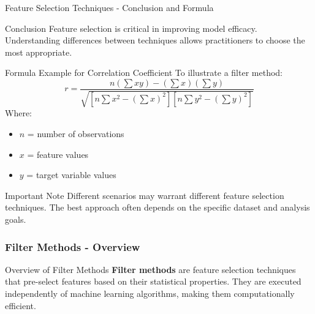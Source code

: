 \documentclass[aspectratio=169]{beamer}
\begin{document}
\begin{frame}[fragile]{Feature Selection Techniques - Conclusion and Formula}
    \begin{block}{Conclusion}
        Feature selection is critical in improving model efficacy. Understanding differences between techniques allows practitioners to choose the most appropriate.
    \end{block}
    
    \begin{block}{Formula Example for Correlation Coefficient}
        To illustrate a filter method:
        \begin{equation}
            r = \frac{n\left(\sum xy\right) - \left(\sum x\right)\left(\sum y\right)}{\sqrt{[n\sum x^2 - \left(\sum x\right)^2][n\sum y^2 - \left(\sum y\right)^2]}}
        \end{equation}
        Where:
        \begin{itemize}
            \item \( n \) = number of observations
            \item \( x \) = feature values
            \item \( y \) = target variable values
        \end{itemize}
    \end{block}

    \begin{block}{Important Note}
        Different scenarios may warrant different feature selection techniques. The best approach often depends on the specific dataset and analysis goals.
    \end{block}
\end{frame}

\begin{frame}[fragile]
    \frametitle{Filter Methods - Overview}
    \begin{block}{Overview of Filter Methods}
        \textbf{Filter methods} are feature selection techniques that pre-select features based on their statistical properties. They are executed independently of machine learning algorithms, making them computationally efficient.
    \end{block}
\end{frame}
\end{document}
